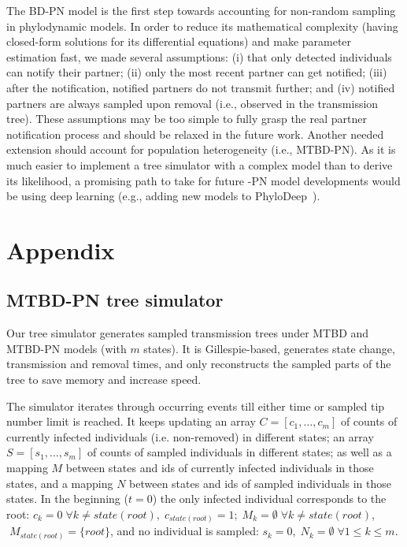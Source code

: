 \documentclass[a4paper,10pt]{article}
\begin{document}
The BD-PN model is the first step towards accounting for non-random sampling in phylodynamic models. In order to reduce its mathematical complexity (having closed-form solutions for its differential equations) and make parameter estimation fast, we made several assumptions: (i) that only detected individuals can notify their partner; (ii) only the most recent partner can get notified; (iii) after the notification, notified partners do not transmit further; and (iv) notified partners are always sampled upon removal (i.e., observed in the transmission tree). These assumptions may be too simple to fully grasp the real partner notification process and should be relaxed in the future work. Another needed extension should account for population heterogeneity (i.e., MTBD-PN). As it is much easier to implement a tree simulator with a complex model than to derive its likelihood, a promising path to take for future -PN model developments would be using deep learning (e.g., adding new models to PhyloDeep~\citep{Voznica2021}). 






\section{Appendix}


\subsection{MTBD-PN tree simulator}

Our tree simulator generates sampled transmission trees under MTBD and MTBD-PN models (with $m$ states). It is Gillespie-based, generates state change, transmission and removal times, and only reconstructs the sampled parts of the tree to save memory and increase speed.  

The simulator iterates through occurring events till either time or sampled tip number limit is reached. 
It keeps updating an array $C = [c_1, \ldots, c_m]$ of counts of currently infected individuals (i.e. non-removed) in different states; an array $S = [s_1, \ldots, s_m]$ of counts of sampled individuals in different states; as well as a mapping $M$ between states and ids of currently infected individuals in those states, and a mapping $N$ between states and ids of sampled individuals in those states.  In the beginning ($t=0$) the only infected individual corresponds to the root: $c_k = 0 \;\forall k \neq state(root), \;c_{state(root)} = 1; \;M_k = \emptyset \; \forall k \neq state(root)$, $ \; M_{state(root)} = \{root\}$, and no individual is sampled: $s_k=0,\;N_k = \emptyset \; \forall 1 \leq k \leq m$.
\end{document}
